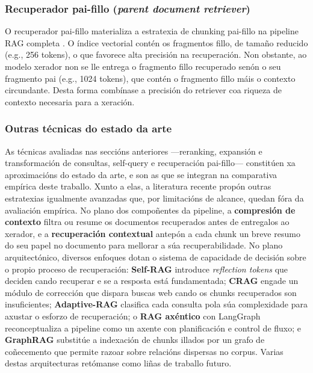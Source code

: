 \documentclass[11pt, a4paper, oneside]{report}
\begin{document}
\subsubsection{Recuperador pai-fillo (\textit{parent document retriever})}
\label{sec:parent_retriever_teoria}

O recuperador pai-fillo materializa a estratexia de chunking pai-fillo na pipeline RAG
completa \citep{langchain2022}. O índice vectorial contén os fragmentos fillo, de
tamaño reducido (e.g., 256 tokens), o que favorece alta precisión na recuperación.
Non obstante, ao modelo xerador non se lle entrega o fragmento fillo recuperado senón
o seu fragmento pai (e.g., 1024 tokens), que contén o fragmento fillo máis o contexto
circundante. Desta forma combínase a precisión do retriever coa riqueza de contexto
necesaria para a xeración.

\subsubsection{Outras técnicas do estado da arte}
\label{sec:outras_tecnicas_teoria}

As técnicas avaliadas nas seccións anteriores —reranking, expansión e transformación
de consultas, self-query e recuperación pai-fillo— constitúen xa aproximacións do
estado da arte, e son as que se integran na comparativa empírica deste traballo. Xunto
a elas, a literatura recente propón outras estratexias igualmente avanzadas que, por
limitacións de alcance, quedan fóra da avaliación empírica. No plano dos compoñentes da
pipeline, a \textbf{compresión de contexto} filtra ou resume os documentos recuperados
antes de entregalos ao xerador, e a \textbf{recuperación contextual} antepón a cada
chunk un breve resumo do seu papel no documento para mellorar a súa recuperabilidade.
No plano arquitectónico, diversos enfoques dotan o sistema de capacidade de decisión
sobre o propio proceso de recuperación: \textbf{Self-RAG} \citep{asai2024self} introduce
\textit{reflection tokens} que deciden cando recuperar e se a resposta está fundamentada;
\textbf{CRAG} \citep{yan2024corrective} engade un módulo de corrección que dispara
buscas web cando os chunks recuperados son insuficientes; \textbf{Adaptive-RAG}
\citep{jeong2024adaptive} clasifica cada consulta pola súa complexidade para axustar o
esforzo de recuperación; o \textbf{RAG axéntico} con LangGraph \citep{langchain2022}
reconceptualiza a pipeline como un axente con planificación e control de fluxo; e
\textbf{GraphRAG} \citep{edge2024local} substitúe a indexación de chunks illados por un
grafo de coñecemento que permite razoar sobre relacións dispersas no corpus. Varias
destas arquitecturas retómanse como liñas de traballo futuro.
\end{document}
